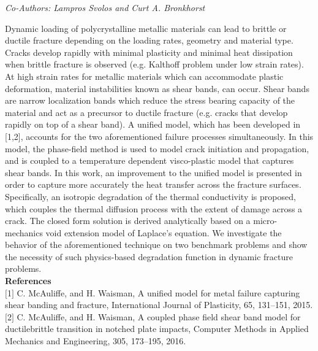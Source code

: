 \begin{center}
\textit{Co-Authors: Lampros Svolos and Curt A. Bronkhorst}
\end{center} 
Dynamic loading of polycrystalline metallic materials can lead to brittle or ductile fracture depending on the loading rates, geometry and material type. Cracks develop rapidly with minimal plasticity and minimal heat dissipation when brittle fracture is observed (e.g. Kalthoff problem under low strain rates). At high strain rates for metallic materials which can accommodate plastic deformation, material instabilities known as shear bands, can occur. Shear bands are narrow localization bands which reduce the stress bearing capacity of the material and act as a precursor to ductile fracture (e.g. cracks that develop rapidly on top of a shear band). A unified model, which has been developed in [1,2], accounts for the two aforementioned failure processes simultaneously. In this model, the phase-field method is used to model crack initiation and propagation, and is coupled to a temperature dependent visco-plastic model that captures shear bands. In this work, an improvement to the unified model is presented in order to capture more accurately the heat transfer across the fracture surfaces. Specifically, an isotropic degradation of the thermal conductivity is proposed, which couples the thermal diffusion process with the extent of damage across a crack. The closed form solution is derived analytically based on a micro-mechanics void extension model of Laplace’s equation. We investigate the behavior of the aforementioned technique on two benchmark problems and show the necessity of such physics-based degradation function in dynamic fracture problems.\\

\noindent\textbf{References}\\
$[$1$]$ C. McAuliffe, and H. Waisman, A unified model for metal failure capturing shear banding and fracture, International Journal of Plasticity, 65, 131–151, 2015.\\\newline
$[$2$]$ C. McAuliffe, and H. Waisman, A coupled phase field shear band model for ductilebrittle transition in notched plate impacts, Computer Methods in Applied Mechanics and Engineering, 305, 173–195, 2016.
